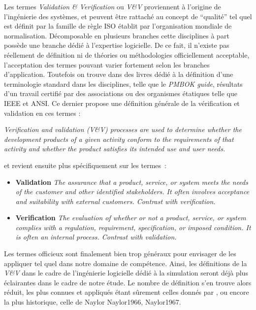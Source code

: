 Les termes \textit{Validation \& Verification} ou \textit{V\&V} proviennent à l'origine de l'ingénierie des systèmes, et peuvent être rattaché au concept de \enquote{qualité} tel quel est définit par la famille de règle ISO établit par l'organisation mondiale de normalisation. Décomposable en plusieurs branches cette disciplines à part possède une branche dédié à l'expertise logicielle. De ce fait, il n'existe pas réellement de définition ni de théories ou méthodologies officiellement acceptable, l'acceptation des termes pouvant varier fortement selon les branches d'application. Toutefois on trouve dans des livres dédié à la définition d'une terminologie standard dans les disciplines, telle que le \textit{PMBOK guide}, résultats d'un travail certifié par des associations ou des organismes étatiques telle que IEEE et ANSI. Ce dernier propose une définition générale de la vérification et validation en ces termes : 

\textit{Verification and validation (V\&V) processes are used to determine whether the development products of a given activity conform to the requirements of that activity and whether the product satisfies its intended use and user needs.}

et revient ensuite plus spécifiquement sur les termes : 

\begin{itemize}
\item \textbf{Validation} \textit{The assurance that a product, service, or system meets the needs of the customer and other identified stakeholders. It often involves acceptance and suitability with external customers. Contrast with verification.}
\item \textbf{Verification} \textit{The evaluation of whether or not a product, service, or system complies with a regulation, requirement, specification, or imposed condition. It is often an internal process. Contrast with validation.}
\end{itemize}

Les termes officieux sont finalement bien trop généraux pour envisager de les appliquer tel quel dans notre domaine de compétence. Ainsi, les définitions de la \textit{V\&V} dans le cadre de l'ingénierie logicielle dédié à la simulation seront déjà plus éclairantes dans le cadre de notre étude. Le nombre de définition s'en trouve alors réduit, les plus connues et appliqués étant sûrement celles donnés par \textcite{Kleijnen1995}, \textcite{Sargent2010} ou encore la plus historique, celle de Naylor {Naylor1966, Naylor1967}. 

